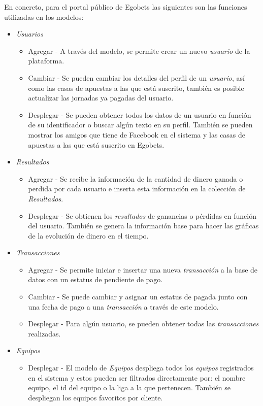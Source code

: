		En concreto, para el portal público de Egobets las siguientes son las funciones utilizadas en los modelos:
		\begin{itemize}
			\item \emph{Usuarios}
				\begin{itemize}
					\item Agregar - A través del modelo, se permite crear un nuevo \emph{usuario} de la plataforma.
					\item Cambiar - Se pueden cambiar los detalles del perfil de un \emph{usuario}, así como las casas de apuestas a las que está suscrito, también es posible actualizar las jornadas ya pagadas del usuario. 
					\item Desplegar - Se pueden obtener todos los datos de un usuario en función de su identificador o buscar algún texto en su perfil. También se pueden mostrar los amigos que tiene de Facebook en el sistema y las casas de apuestas a las que está suscrito en Egobets.
				\end{itemize}
			\item \emph{Resultados}
			\begin{itemize}
				\item Agregar - Se recibe la información de la cantidad de dinero ganada o perdida por cada usuario e inserta esta información en la colección de \emph{Resultados}.
				\item Desplegar - Se obtienen los \emph{resultados} de ganancias o pérdidas en función del usuario. También se genera la información base para hacer las gráficas de la evolución de dinero en el tiempo.
			\end{itemize}
			\item \emph{Transacciones}
				\begin{itemize}
					\item Agregar - Se permite iniciar e insertar una nueva \emph{transacción} a la base de datos con un estatus de pendiente de pago.
					\item Cambiar - Se puede cambiar y asignar un estatus de pagada junto con una fecha de pago a una \emph{transacción} a través de este modelo.
					\item Desplegar - Para algún usuario, se pueden obtener todas las \emph{transacciones} realizadas.
				\end{itemize}
			\item \emph{Equipos}
				\begin{itemize}
					\item Desplegar - El modelo  de \emph{Equipos} despliega todos los \emph{equipos} registrados en el sistema y estos pueden ser filtrados directamente por: el nombre equipo, el id del equipo o la liga a la que pertenecen. También se despliegan los equipos favoritos por cliente.

\end{itemize}
\end{itemize}
